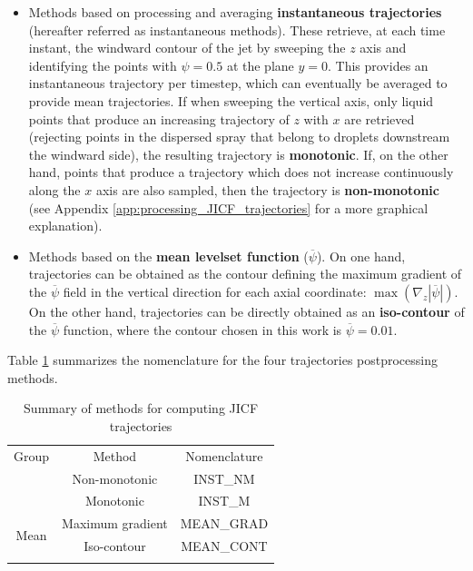 \begin{itemize}

	\item Methods based on processing and averaging \textbf{instantaneous trajectories} (hereafter referred as instantaneous methods). These retrieve, at each time instant, the windward contour of the jet by sweeping the $z$ axis and identifying the points with $\psi = 0.5$ at the plane $y = 0$. This provides an instantaneous trajectory per timestep, which can eventually be averaged to provide mean trajectories. If when sweeping the vertical axis, only liquid points that produce an increasing trajectory of $z$ with $x$ are retrieved (rejecting points in the dispersed spray that belong to droplets downstream the windward side), the resulting trajectory is \textbf{monotonic}. If, on the other hand, points that produce a trajectory which does not increase continuously along the $x$ axis are also sampled, then the trajectory is \textbf{non-monotonic} (see Appendix \ref{app:processing_JICF_trajectories} for a more graphical explanation).
	
	\item Methods based on the \textbf{mean levelset function} ($\overline{\psi}$). On one hand, trajectories can be obtained as the contour defining the maximum gradient of the $\overline{\psi}$ field in the vertical direction for each axial coordinate: $\max \left( \nabla_z | \overline{\psi} | \right)$. On the other hand, trajectories can be directly obtained as an \textbf{iso-contour} of the $\overline{\psi}$ function, where the contour chosen in this work is $\overline{\psi} = 0.01$.

\end{itemize}

\clearpage

Table \ref{tab:jicf_tools_trajectories_obtention} summarizes the nomenclature for the four trajectories postprocessing methods.

\begin{table}[!h]
\centering
\caption{Summary of methods for computing JICF trajectories}
\begin{tabular}{ccc}
\thickhline
Group & Method & Nomenclature \\
\thickhline
\multirow{2}{*}{Instantaneous} & Non-monotonic & INST\_NM \\
 & Monotonic & INST\_M \\
 \hline
\multirow{2}{*}{Mean} & Maximum gradient & MEAN\_GRAD \\
 & Iso-contour & MEAN\_CONT \\
\thickhline
\end{tabular}
\label{tab:jicf_tools_trajectories_obtention}
\end{table}


